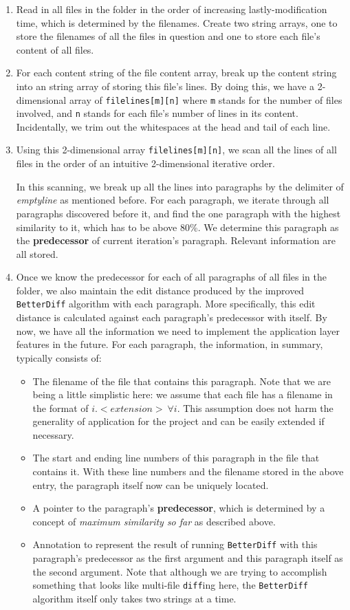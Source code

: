 \documentclass{article}
\begin{document}
\begin{enumerate}
  \item Read in all files in the folder in the order of increasing lastly-modification time, which is determined by the filenames. Create two string arrays, one to store the filenames of all the files in question and one to store each file's content of all files. 
  \item For each content string of the file content array, break up the content string into an string array of storing this file's lines. By doing this, we have a 2-dimensional array of \texttt{filelines[m][n]} where \texttt{m} stands for the number of files involved, and \texttt{n} stands for each file's number of lines in its content. Incidentally, we trim out the whitespaces at the head and tail of each line. 
  \item Using this 2-dimensional array \texttt{filelines[m][n]}, we scan all the lines of all files in the order of an intuitive 2-dimensional iterative order.

  In this scanning, we break up all the lines into paragraphs by the delimiter of \textit{emptyline} as mentioned before. For each paragraph, we iterate through all paragraphs discovered before it, and find the one paragraph with the highest similarity to it, which has to be above 80\%. We determine this paragraph as the \textbf{predecessor} of current iteration's paragraph. Relevant information are all stored. 
  \item Once we know the predecessor for each of all paragraphs of all files in the folder, we also maintain the edit distance produced by the improved \texttt{BetterDiff} algorithm with each paragraph. More specifically, this edit distance is calculated against each paragraph's predecessor with itself. By now, we have all the information we need to implement the application layer features in the future. For each paragraph, the information, in summary, typically consists of:
  \begin{itemize}
    \item The filename of the file that contains this paragraph. Note that we are being a little simplistic here: we assume that each file has a filename in the format of $i.<extension>\ \forall i$. This assumption does not harm the generality of application for the project and can be easily extended if necessary.
    \item The start and ending line numbers of this paragraph in the file that contains it. With these line numbers and the filename stored in the above entry, the paragraph itself now can be uniquely located.
    \item A pointer to the paragraph's \textbf{predecessor}, which is determined by a concept of \textit{maximum similarity so far} as described above.
    \item Annotation to represent the result of running \texttt{BetterDiff} with this paragraph's predecessor as the first argument and this paragraph itself as the second argument. Note that although we are trying to accomplish something that looks like multi-file \texttt{diff}ing here, the \texttt{BetterDiff} algorithm itself only takes two strings at a time. 


\end{itemize}
\end{enumerate}
\end{document}
